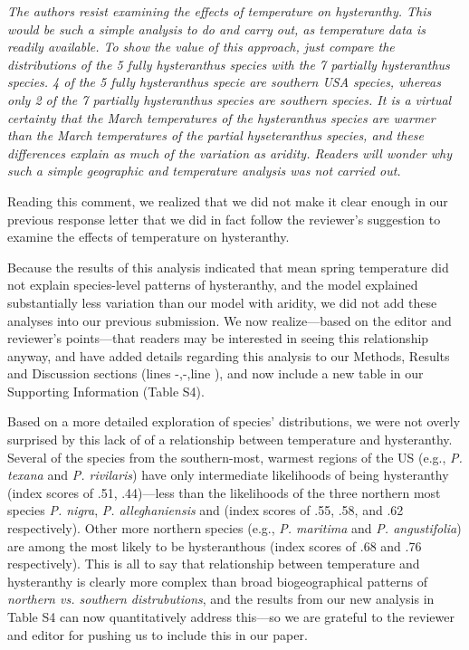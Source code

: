 \documentclass{article}[12pt]
\begin{document}
\emph{The authors resist examining the effects of temperature on hysteranthy.  This would be such a simple analysis to do and carry out, as temperature data is readily available. To show the value of this approach, just compare the distributions of the 5 fully hysteranthus species with the 7 partially hysteranthus species. 4 of the 5 fully hysteranthus specie are southern USA species, whereas only 2 of the 7 partially hysteranthus species are southern species. It is a virtual certainty that the March temperatures of the hysteranthus species are warmer than the March temperatures of the partial hyseteranthus species, and these differences explain as much of the variation as aridity. Readers will wonder why such a simple geographic and temperature analysis was not carried out.}

Reading this comment, we realized that we did not make it clear enough in our previous response letter that we did in fact follow the reviewer's suggestion to examine the effects of temperature on hysteranthy.

Because the results of this analysis indicated that mean spring temperature did not explain species-level patterns of hysteranthy, and the model explained substantially less variation than our model with aridity, we did not add these analyses into our previous submission. We now realize---based on the editor and reviewer's points---that readers may be interested in seeing this relationship anyway, and have added details regarding this analysis to our Methods, Results and Discussion sections (lines -,-,line ), and now include a new table in our Supporting Information (Table S4).

Based on a more detailed exploration of species' distributions, we were not overly surprised by this lack of of a relationship between temperature and hysteranthy. %
Several of the species from the southern-most, warmest regions of the US (e.g., \emph{P. texana} and \emph{P. rivilaris}) have only intermediate likelihoods of being hysteranthy (index scores of .51, .44)---less than the likelihoods of the three northern most species \emph{P. nigra}, \emph{P. alleghaniensis} and  (index scores of .55, .58, and .62 respectively). Other more northern species (e.g., \emph{P. maritima} and \emph{P. angustifolia}) are among the most likely to be hysteranthous (index scores of .68 and .76 respectively). This is all to say that relationship between temperature and hysteranthy is clearly more complex than broad biogeographical patterns of \emph{northern vs. southern distrubutions}, and the results from our new analysis in Table S4 can now quantitatively address this---so we are grateful to the reviewer and editor for pushing us to include this in our paper.
\end{document}
